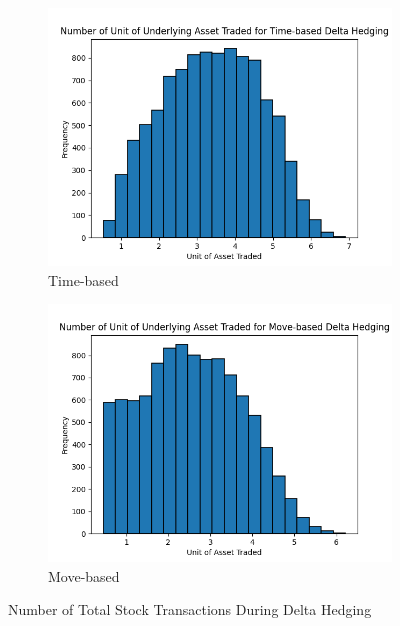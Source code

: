 \documentclass[12pt]{article}
\begin{document}
\begin{figure}[H]
  \centering
  \begin{subfigure}{.5\textwidth}
    \centering
    \includegraphics[width=\linewidth]{num-trade-time.png}
    \caption{Time-based}
  \end{subfigure}%
  \begin{subfigure}{.5\textwidth}
    \centering
    \includegraphics[width=\linewidth]{num-trade-move.png}
    \caption{Move-based}
  \end{subfigure}%
  \caption{Number of Total Stock Transactions During Delta Hedging}
\end{figure}
\end{document}
